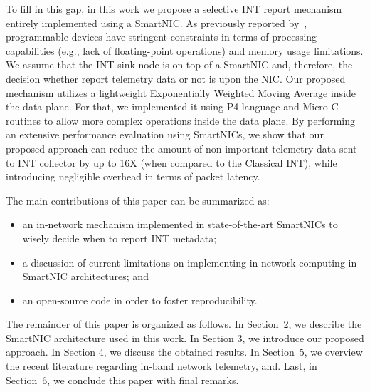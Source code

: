 To fill in this gap, in this work we propose a selective INT report mechanism entirely implemented using a SmartNIC. As previously reported by~\cite{aina2021}, programmable devices have stringent constraints in terms of processing capabilities (e.g., lack of floating-point operations) and memory usage limitations. We assume that the INT sink node is on top of a SmartNIC and, therefore, the decision whether report telemetry data or not is upon the NIC. Our proposed mechanism utilizes a lightweight Exponentially Weighted Moving Average inside the data plane. For that, we implemented it using P4 language and Micro-C routines to allow more complex operations inside the data plane. By performing an extensive performance evaluation using SmartNICs, we show that our proposed approach can reduce the amount of non-important telemetry data sent to INT collector by up to 16X (when compared to the Classical INT), while introducing negligible overhead in terms of packet latency.

The main contributions of this paper can be summarized as:

\begin{itemize}
    \item an in-network mechanism implemented in state-of-the-art SmartNICs to wisely decide when to report INT metadata;
    \item a discussion of current limitations on implementing in-network computing in SmartNIC architectures; and
    \item an open-source code in order to foster reproducibility. 
\end{itemize}

The remainder of this paper is organized as follows. In Section~2, we describe the SmartNIC architecture used in this work. In Section 3, we introduce our proposed approach. In Section 4, we discuss the obtained results. In Section~5, we overview the recent literature regarding in-band network telemetry, and. Last, in Section~6, we conclude this paper with final remarks.





